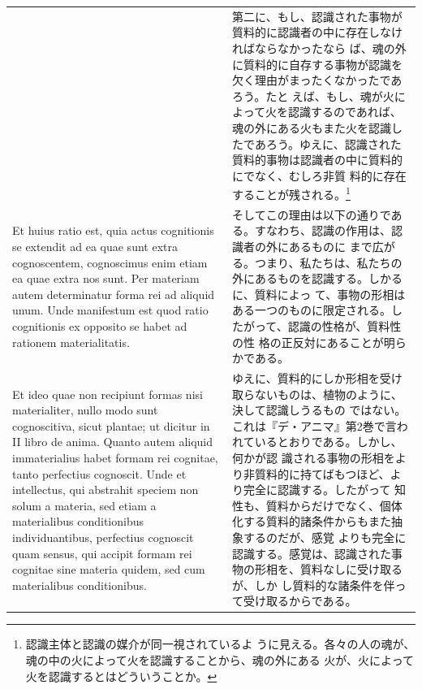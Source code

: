 \documentclass[paper=a4paper,fontsize=10pt,jafontsize=9pt,titlepage]{jlreq}
\begin{document}
\begin{longtable}{p{21em}p{21em}}
&

第二に、もし、認識された事物が質料的に認識者の中に存在しなければならなかったなら
ば、魂の外に質料的に自存する事物が認識を欠く理由がまったくなかったであろう。たと
えば、もし、魂が火によって火を認識するのであれば、魂の外にある火もまた火を認識し
たであろう。ゆえに、認識された質料的事物は認識者の中に質料的にでなく、むしろ非質
料的に存在することが残される。\footnote{認識主体と認識の媒介が同一視されているよ
うに見える。各々の人の魂が、魂の中の火によって火を認識することから、魂の外にある
火が、火によって火を認識するとはどういうことか。}

\\[1em]

Et huius ratio est, quia actus cognitionis se extendit ad ea quae sunt extra
cognoscentem, cognoscimus enim etiam ea quae extra nos sunt. Per materiam autem
determinatur forma rei ad aliquid unum. Unde manifestum est quod ratio
cognitionis ex opposito se habet ad rationem materialitatis.

&

そしてこの理由は以下の通りである。すなわち、認識の作用は、認識者の外にあるものに
まで広がる。つまり、私たちは、私たちの外にあるものを認識する。しかるに、質料によっ
て、事物の形相はある一つのものに限定される。したがって、認識の性格が、質料性の性
格の正反対にあることが明らかである。

\\[1em]

Et ideo quae non recipiunt formas nisi materialiter, nullo modo sunt
cognoscitiva, sicut plantae; ut dicitur in II libro de anima. Quanto autem
aliquid immaterialius habet formam rei cognitae, tanto perfectius
cognoscit. Unde et intellectus, qui abstrahit speciem non solum a materia, sed
etiam a materialibus conditionibus individuantibus, perfectius cognoscit quam
sensus, qui accipit formam rei cognitae sine materia quidem, sed cum
materialibus conditionibus.

&

ゆえに、質料的にしか形相を受け取らないものは、植物のように、決して認識しうるもの
ではない。これは『デ・アニマ』第2巻で言われているとおりである。しかし、何かが認
識される事物の形相をより非質料的に持てばもつほど、より完全に認識する。したがって
知性も、質料からだけでなく、個体化する質料的諸条件からもまた抽象するのだが、感覚
よりも完全に認識する。感覚は、認識された事物の形相を、質料なしに受け取るが、しか
し質料的な諸条件を伴って受け取るからである。
 

\\[1em]


\end{longtable}
\end{document}
